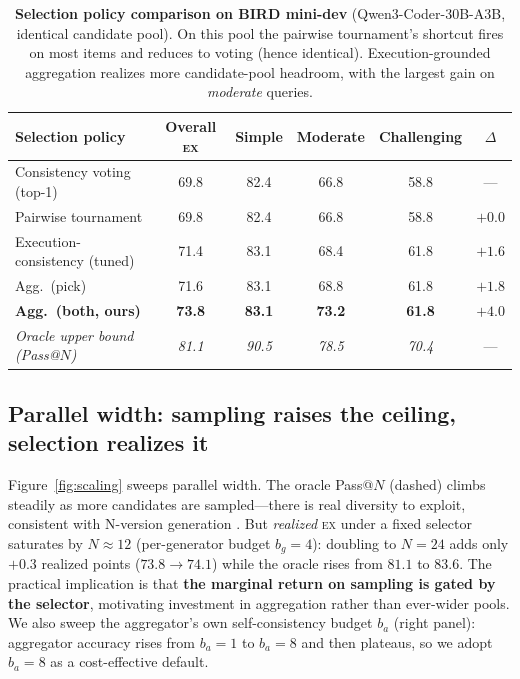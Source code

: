 \documentclass{article}
\newcommand{\ex}{\textsc{ex}\xspace}
\newcommand{\bestcell}[1]{\textbf{#1}}
\begin{document}
\begin{table}[t]
\centering
\small
\caption{\textbf{Selection policy comparison on BIRD mini-dev} (Qwen3-Coder-30B-A3B, identical candidate pool). On this pool the pairwise tournament's shortcut fires on most items and reduces to voting (hence identical). Execution-grounded aggregation realizes more candidate-pool headroom, with the largest gain on \emph{moderate} queries.}
\label{tab:agg}
\begin{tabular}{@{}lccccc@{}}
\toprule
\textbf{Selection policy} & \textbf{Overall \ex} & \textbf{Simple} & \textbf{Moderate} & \textbf{Challenging} & $\Delta$ \\
\midrule
Consistency voting (top-1)        & 69.8 & 82.4 & 66.8 & 58.8 & --- \\
Pairwise tournament \citep{li2026deepeye} & 69.8 & 82.4 & 66.8 & 58.8 & $+0.0$ \\
Execution-consistency (tuned)     & 71.4 & 83.1 & 68.4 & 61.8 & $+1.6$ \\
Agg.\ (pick)        & 71.6 & 83.1 & 68.8 & 61.8 & $+1.8$ \\
\textbf{Agg.\ (both, ours)}        & \bestcell{73.8} & \bestcell{83.1} & \bestcell{73.2} & \bestcell{61.8} & $\mathbf{+4.0}$ \\
\midrule
\textit{Oracle upper bound (Pass@$N$)} & \textit{81.1} & \textit{90.5} & \textit{78.5} & \textit{70.4} & --- \\
\bottomrule
\end{tabular}
\end{table}


\subsection{Parallel width: sampling raises the ceiling, selection realizes it}
\label{sec:width}

Figure~\ref{fig:scaling} sweeps parallel width. The oracle Pass@$N$ (dashed) climbs steadily as more candidates are sampled---there is real diversity to exploit, consistent with N-version generation \citep{li2026deepeye,chen1978nversion}. But \emph{realized} \ex{} under a fixed selector saturates by $N\!\approx\!12$ (per-generator budget $b_g\!=\!4$): doubling to $N{=}24$ adds only $+0.3$ realized points ($73.8\!\rightarrow\!74.1$) while the oracle rises from $81.1$ to $83.6$. The practical implication is that \textbf{the marginal return on sampling is gated by the selector}, motivating investment in aggregation rather than ever-wider pools. We also sweep the aggregator's own self-consistency budget $b_a$ (right panel): aggregator accuracy rises from $b_a\!=\!1$ to $b_a\!=\!8$ and then plateaus, so we adopt $b_a\!=\!8$ as a cost-effective default.
\end{document}
